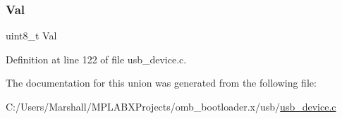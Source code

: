 \mbox{\label{unionuint8__t___v_a_l_aa0c179f4462bb12ca1ed40d18c89cda1}} 
\subsubsection{\texorpdfstring{Val}{Val}}
{\footnotesize\ttfamily uint8\+\_\+t Val}



Definition at line 122 of file usb\+\_\+device.\+c.



The documentation for this union was generated from the following file\+:\begin{DoxyCompactItemize}
\item 
C\+:/\+Users/\+Marshall/\+M\+P\+L\+A\+B\+X\+Projects/omb\+\_\+bootloader.\+x/usb/\mbox{\hyperlink{usb__device_8c}{usb\+\_\+device.\+c}}\end{DoxyCompactItemize}
